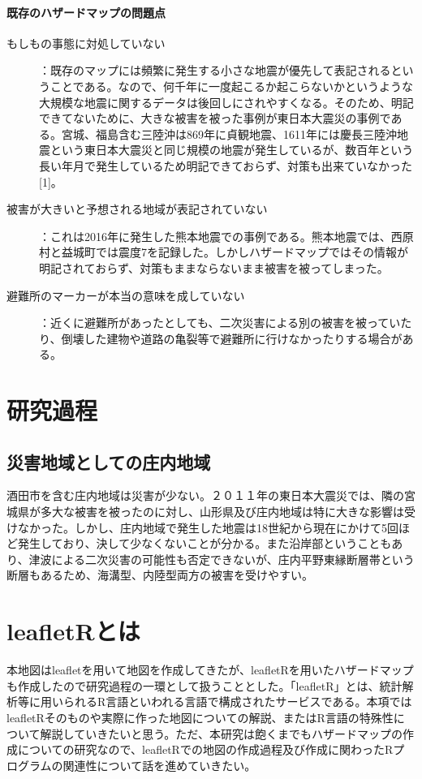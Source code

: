 \documentclass[report]{jsbook}
\begin{document}
\subsubsection{既存のハザードマップの問題点}
\begin{description}
\item[もしもの事態に対処していない]：既存のマップには頻繁に発生する小さな地震が優先して表記されるということである。なので、何千年に一度起こるか起こらないかというような大規模な地震に関するデータは後回しにされやすくなる。そのため、明記できてないために、大きな被害を被った事例が東日本大震災の事例である。宮城、福島含む三陸沖は869年に貞観地震、1611年には慶長三陸沖地震という東日本大震災と同じ規模の地震が発生しているが、数百年という長い年月で発生しているため明記できておらず、対策も出来ていなかった[1]。
\item[被害が大きいと予想される地域が表記されていない]：これは2016年に発生した熊本地震での事例である。熊本地震では、西原村と益城町では震度7を記録した。しかしハザードマップではその情報が明記されておらず、対策もままならないまま被害を被ってしまった。
\item[避難所のマーカーが本当の意味を成していない]：近くに避難所があったとしても、二次災害による別の被害を被っていたり、倒壊した建物や道路の亀裂等で避難所に行けなかったりする場合がある。
\end{description}
\chapter{研究過程}
\section{災害地域としての庄内地域}
酒田市を含む庄内地域は災害が少ない。２０１１年の東日本大震災では、隣の宮城県が多大な被害を被ったのに対し、山形県及び庄内地域は特に大きな影響は受けなかった。しかし、庄内地域で発生した地震は18世紀から現在にかけて5回ほど発生しており、決して少なくないことが分かる。また沿岸部ということもあり、津波による二次災害の可能性も否定できないが、庄内平野東縁断層帯という断層もあるため、海溝型、内陸型両方の被害を受けやすい。
\chapter{leafletRとは}
本地図はleafletを用いて地図を作成してきたが、leafletRを用いたハザードマップも作成したので研究過程の一環として扱うこととした。「leafletR」とは、統計解析等に用いられるR言語といわれる言語で構成されたサービスである。本項ではleafletRそのものや実際に作った地図についての解説、またはR言語の特殊性について解説していきたいと思う。ただ、本研究は飽くまでもハザードマップの作成についての研究なので、leafletRでの地図の作成過程及び作成に関わったRプログラムの関連性について話を進めていきたい。
\end{document}
